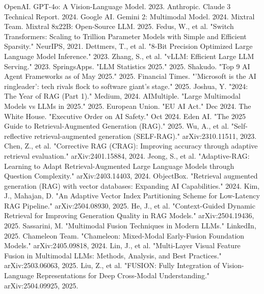 \documentclass{article}
\begin{document}
\begin{thebibliography}{99}
OpenAI. GPT-4o: A Vision-Language Model. 2023.
Anthropic. Claude 3 Technical Report. 2024.
Google AI. Gemini 2: Multimodal Model. 2024.
Mixtral Team. Mixtral 8x22B: Open-Source LLM. 2025.
Fedus, W., et al. "Switch Transformers: Scaling to Trillion Parameter Models with Simple and Efficient Sparsity." NeurIPS, 2021.
Dettmers, T., et al. "8-Bit Precision Optimized Large Language Model Inference." 2023.
Zhang, S., et al. "vLLM: Efficient Large LLM Serving." 2023.
SpringsApps. "LLM Statistics 2025." 2025.
Shakudo. "Top 9 AI Agent Frameworks as of May 2025." 2025.
Financial Times. "'Microsoft is the AI ringleader': tech rivals flock to software giant's stage." 2025.
Joshua, Y. "2024: The Year of RAG (Part 1)." Medium, 2024.
AIMultiple. "Large Multimodal Models vs LLMs in 2025." 2025.
European Union. "EU AI Act." Dec 2024.
The White House. "Executive Order on AI Safety." Oct 2024.
Eden AI. "The 2025 Guide to Retrieval-Augmented Generation (RAG)." 2025.
Wu, A., et al. "Self-reflective retrieval-augmented generation (SELF-RAG)." arXiv:2310.11511, 2023.
Chen, Z., et al. "Corrective RAG (CRAG): Improving accuracy through adaptive retrieval evaluation." arXiv:2401.15884, 2024.
Jeong, S., et al. "Adaptive-RAG: Learning to Adapt Retrieval-Augmented Large Language Models through Question Complexity." arXiv:2403.14403, 2024.
ObjectBox. "Retrieval augmented generation (RAG) with vector databases: Expanding AI Capabilities." 2024.
Kim, J., Mahajan, D. "An Adaptive Vector Index Partitioning Scheme for Low-Latency RAG Pipeline." arXiv:2504.08930, 2025.
He, J., et al. "Context-Guided Dynamic Retrieval for Improving Generation Quality in RAG Models." arXiv:2504.19436, 2025.
Sassarini, M. "Multimodal Fusion Techniques in Modern LLMs." LinkedIn, 2025.
Chameleon Team. "Chameleon: Mixed-Modal Early-Fusion Foundation Models." arXiv:2405.09818, 2024.
Lin, J., et al. "Multi-Layer Visual Feature Fusion in Multimodal LLMs: Methods, Analysis, and Best Practices." arXiv:2503.06063, 2025.
Liu, Z., et al. "FUSION: Fully Integration of Vision-Language Representations for Deep Cross-Modal Understanding." arXiv:2504.09925, 2025.

\end{thebibliography}
\end{document}
